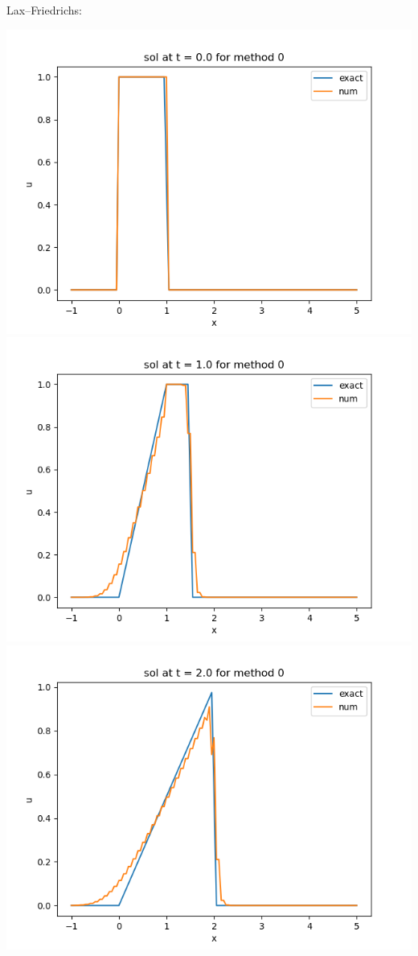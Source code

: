 \documentclass{article}
\begin{document}
Lax--Friedrichs:
\begin{center}
	\includegraphics[scale=.23]{hw13 sol t = 0 method 0}
	\includegraphics[scale=.23]{hw13 sol t = 1 method 0}
	\includegraphics[scale=.23]{hw13 sol t = 2 method 0}

\end{center}
\end{document}
